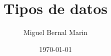 \documentclass[aspectratio=169]{beamer}
\title{Tipos de datos} %
\author{Miguel Bernal Marin} %
\institute[Escuela] %
{
 Nombre de la Institución\\%
\medskip
\textit{correo} %
}
\date{
    \today
} %
\begin{document}
\begin{frame}
    \titlepage
\end{frame}


\end{document}

